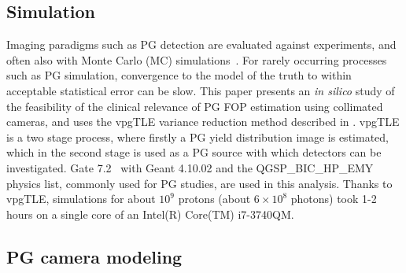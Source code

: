 \documentclass[a4paper,english]{article}
\begin{document}
\subsection{Simulation}

Imaging paradigms such as PG detection are evaluated against experiments, and often also with Monte Carlo (MC) simulations~\citep{Moteabbed2011,Gueth2013,Robert2013,Golnik2014a,Janssen2014}. For rarely occurring processes such as PG simulation, convergence to the model of the truth to within acceptable statistical error can be slow. This paper presents an \emph{in silico} study of the feasibility of the clinical relevance of PG FOP estimation using collimated cameras, and uses the vpgTLE variance reduction method described in \cite{Huisman2016}. vpgTLE is a two stage process, where firstly a PG yield distribution image is estimated, which in the second stage is used as a PG source with which detectors can be investigated. Gate 7.2~\citep{Sarrut2014} with Geant 4.10.02 and the QGSP\_BIC\_HP\_EMY physics list, commonly used for PG studies, are used in this analysis. Thanks to vpgTLE, simulations for about $10^9$ protons (about $6\times10^8$ photons) took 1-2 hours on a single core of an Intel(R) Core(TM) i7-3740QM.

\subsection{PG camera modeling}\label{sec:camera}
\end{document}

